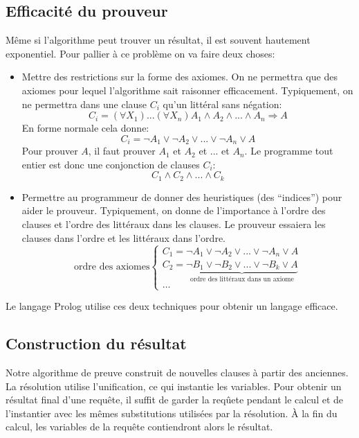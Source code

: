 \subsection{Efficacité du prouveur}

Même si l'algorithme peut trouver un résultat, il est souvent hautement exponentiel.
Pour pallier à ce problème on va faire deux choses:
\begin{itemize}
\item Mettre des restrictions sur la forme des axiomes.
On ne permettra que des axiomes pour lequel l'algorithme sait raisonner efficacement.
Typiquement, on ne permettra dans une clause $C_i$ qu'un littéral sans négation:
	$$C_i = (\forall X_{1}) ... (\forall X_{n}) A_{1} \wedge A_{2} \wedge ... \wedge A_{n} \Rightarrow A$$
En forme normale cela donne:
	$$C_{i} = \neg A_{1} \vee \neg A_{2} \vee ... \vee \neg A_{n} \vee A$$
Pour prouver $A$, il faut prouver $A_{1}$ et $A_{2}$ et ... et $A_{n}$.
Le programme tout entier est donc une conjonction de clauses $C_i$:
	$$C_{1} \wedge C_{2} \wedge ... \wedge C_{k}$$
\item Permettre au programmeur de donner des heuristiques (des ``indices'') pour aider le prouveur.
Typiquement, on donne de l'importance à l'ordre des clauses et l'ordre des littéraux dans les clauses.
Le prouveur essaiera les clauses dans l'ordre et les littéraux dans l'ordre.
	$$\text{ordre des axiomes}\left \{
	\begin{array}{l}
	C_{1} = \neg A_{1} \vee \neg A_{2} \vee ... \vee \neg A_{n} \vee A \\
	C_{2} = \underbrace{\neg B_{1} \vee \neg B_{2} \vee ... \vee \neg B_{k} \vee A}_{\text{ordre des littéraux dans un axiome}}\\
	\ldots
	\end{array}
	\right.$$
\end{itemize}
Le langage Prolog utilise ces deux techniques pour obtenir un langage efficace.

\subsection{Construction du résultat}

Notre algorithme de preuve construit de nouvelles clauses à partir des anciennes.
La résolution utilise l'unification, ce qui instantie les variables.
Pour obtenir un résultat final d'une requête, il suffit de garder la reqûete
pendant le calcul et de l'instantier avec les mêmes substitutions utilisées
par la résolution.
À la fin du calcul, les variables de la requête contiendront alors le résultat.

